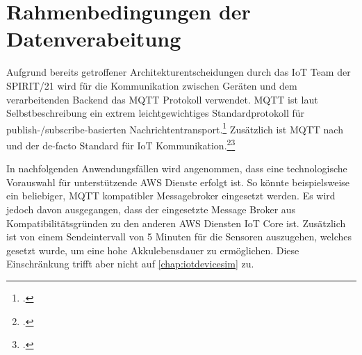 \section{Rahmenbedingungen der Datenverabeitung}\label{chap:rahmendatenverarbeitung}
Aufgrund bereits getroffener Architekturentscheidungen durch das \ac{IoT} Team der SPIRIT/21 wird für die Kommunikation zwischen Geräten und dem verarbeitenden Backend das \ac{MQTT} Protokoll verwendet. \ac{MQTT} ist laut Selbstbeschreibung ein extrem leichtgewichtiges Standardprotokoll für publish-/subscribe-basierten Nachrichtentransport.\footcite[Vgl.][]{o.V..2020} Zusätzlich ist \ac{MQTT} nach \citeauthor{Skerrett.25.10.2019} und \citeauthor{Cabe.17.04.2018} der de-facto Standard für \ac{IoT} Kommunikation.\footcite[Vgl.][]{Skerrett.25.10.2019}\nzitat \footcite[Vgl.][]{Cabe.17.04.2018} 

In nachfolgenden Anwendungsfällen wird angenommen, dass eine technologische Vorauswahl für unterstützende \ac{AWS} Dienste erfolgt ist.
So könnte beispielsweise ein beliebiger, \ac{MQTT} kompatibler Messagebroker eingesetzt werden. Es wird jedoch davon ausgegangen, dass der eingesetzte Message Broker aus Kompatibilitätsgründen zu den anderen \ac{AWS} Diensten \ac{IoT} Core ist. Zusätzlich ist von einem Sendeintervall von 5 Minuten für die Sensoren auszugehen, welches gesetzt wurde, um eine hohe Akkulebensdauer zu ermöglichen. Diese Einschränkung trifft aber nicht auf \autoref{chap:iotdevicesim} zu.

